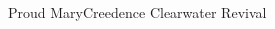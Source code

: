 \documentclass[a4paper,11pt,french]{article}
\begin{document}
\begin{Song}{Proud Mary}{Creedence Clearwater Revival}
\begin{multicols}{2}
\end{multicols}

\vfill

\begin{multicols}{2}

\gridGroupNormal

\begin{Chords}
\hline
\\\hline
\end{Chords}
\espaceInterGrille


\begin{Chords}
\hline
\\\hline
\end{Chords}

\end{multicols}

\vfill

\end{Song}

\end{document}
